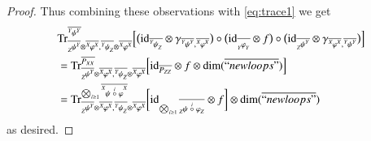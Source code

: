 \documentclass{amsart}
\def\tn{\textnormal}
\def\dim{\tn{dim}}
\def\Trace{\tn{Tr}}
\def\ol{\overline}
\def\id{\tn{id}}
\newcommand{\feeddd}[3]{{\tensor*[^{#2}_{\color{white}{!}}]{{#1}}{^{#3}}}}%
\newcommand{\feeddc}[3]{{\tensor*[^{#2}]{{#1}}{_{#3}}}}
\newcommand{\feedcd}[3]{{\tensor*[_{#2}]{{#1}}{^{#3}}}}
\newcommand{\feedcc}[3]{{\tensor*[^{\color{white}{!}}_{#2}]{{#1}}{_{#3}}}}
\theoremstyle{remark}
\theoremstyle{definition}
\begin{document}
\begin{proof}
Thus combining these observations with \eqref{eq:trace1} we get
\begin{align*}
 &\Trace^{\ol{\feeddd{\psi}{Y}{Y}}}_{\ol{\feedcd{\psi}{Z}{Y}}\otimes\ol{\feeddd{\varphi}{X}{X}},\ol{\feeddc{\psi}{Y}{Z}}\otimes\ol{\feeddd{\varphi}{X}{X}}}
\Big[
\big(\id_{\ol{\feeddc{\psi}{Y}{Z}}}\otimes\gamma_{\ol{\feeddd{\psi}{Y}{Y}},\ol{\feeddd{\varphi}{X}{X}}}\big)\circ\big(\id_{\ol{\feedcc{\varphi}{Y}{Y}}}\otimes f\big)\circ\big(\id_{\ol{\feedcd{\psi}{Z}{Y}}}\otimes\gamma_{\ol{\feeddd{\varphi}{X}{X}},\ol{\feeddd{\psi}{Y}{Y}}}\big)
\Big]\\
 &=\Trace^{\ol{P_{XX}}}_{\ol{\feedcd{\psi}{Z}{Y}}\otimes\ol{\feeddd{\varphi}{X}{X}},\ol{\feeddc{\psi}{Y}{Z}}\otimes\ol{\feeddd{\varphi}{X}{X}}}
 \Big[\id_{\ol{P_{ZZ}}}\otimes f\otimes\dim(\ol{``newloops"})\Big]\\
  &=\Trace^{\bigotimes_{i\ge1}\ol{\feeddd{\psi\;\accentset{i}{\circ}\;\varphi}{X}{X}}}_{\ol{\feedcd{\psi}{Z}{Y}}\otimes\ol{\feeddd{\varphi}{X}{X}},\ol{\feeddc{\psi}{Y}{Z}}\otimes\ol{\feeddd{\varphi}{X}{X}}}\bigg[\id_{\bigotimes_{i\ge1}\ol{\feedcc{\psi\;\accentset{i}{\circ}\;\varphi}{Z}{Z}}}\otimes f\bigg]\otimes\dim(\ol{``newloops"})
 \end{align*}
 as desired.
 
 \newpage


\end{proof}
\end{document}
